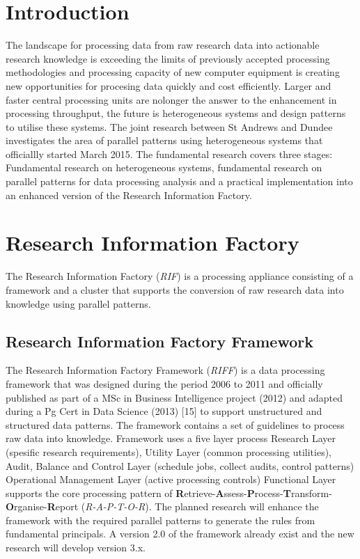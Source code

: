 \documentclass{acm_proc_article-sp}
\begin{document}
\section{Introduction}
The landscape for processing data from raw research data into actionable research knowledge is exceeding the limits of previously accepted processing methodologies and processing capacity of new computer equipment is creating new opportunities for procesing data quickly and cost efficiently. 
Larger and faster central processing units are nolonger the answer to the enhancement in processing throughput, the future is heterogeneous systems and design patterns to utilise these systems.
The joint research between St Andrews and Dundee investigates the area of parallel patterns using heterogeneous systems that officiallly started March 2015. The fundamental research covers three stages:
Fundamental research on heterogeneous systems, fundamental research on parallel patterns for data processing analysis and a practical implementation into an enhanced version of the Research Information Factory. 
\section{Research Information Factory}
The Research Information Factory (\textit{RIF}) is a processing appliance consisting of a framework and a cluster that supports the conversion of raw research data into knowledge using parallel patterns. 
\subsection{Research Information Factory Framework}
The Research Information Factory Framework (\textit{RIFF}) is a data processing framework that was designed during the period 2006 to 2011 and officially published as part of a MSc in Business Intelligence project (2012) and adapted during a Pg Cert in Data Science (2013) [15] to support unstructured and structured data patterns.  
The framework contains a set of guidelines to process raw data into knowledge. 
Framework uses a five layer process Research Layer (spesific research requirements), Utility Layer (common processing utilities), Audit, Balance and Control Layer (schedule jobs, collect audits, control patterns)
Operational Management Layer (active processing controls) Functional Layer supports the core processing pattern of \textbf{R}etrieve-\textbf{A}ssess-\textbf{P}rocess-\textbf{T}ransform-\textbf{O}rganise-\textbf{R}eport (\textit{R-A-P-T-O-R}). The planned research will enhance the framework with the required parallel patterns to generate the rules from fundamental principals. A version 2.0 of the framework already exist and the new research will develop version 3.x.
\end{document}
